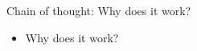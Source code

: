 \begin{frame}{Chain of thought: Why does it work?}

\vfill

\begin{itemize}
    \item \ques Why does it work?
\end{itemize}

\vfill

\end{frame}



\endlecture

